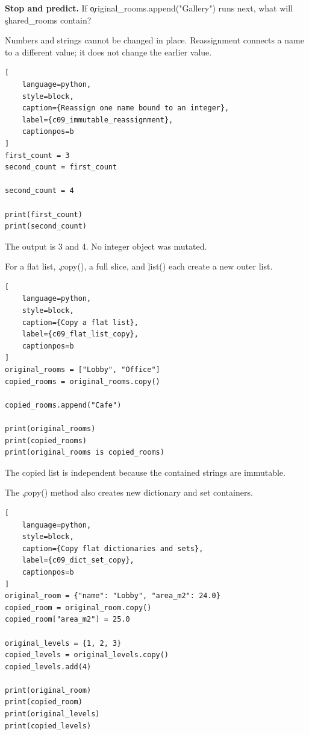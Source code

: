 \begin{NoteBox}
\textbf{Stop and predict.} If \c{original_rooms.append("Gallery")} runs next,
what will \c{shared_rooms} contain?
\end{NoteBox}


Numbers and strings cannot be changed in place. Reassignment connects a name to
a different value; it does not change the earlier value.

\begin{lstlisting}[
    language=python,
    style=block,
    caption={Reassign one name bound to an integer},
    label={c09_immutable_reassignment},
    captionpos=b
]
first_count = 3
second_count = first_count

second_count = 4

print(first_count)
print(second_count)
\end{lstlisting}

The output is 3 and 4. No integer object was mutated.


For a flat list, \c{.copy()}, a full slice, and \c{list()} each create a new
outer list.

\begin{lstlisting}[
    language=python,
    style=block,
    caption={Copy a flat list},
    label={c09_flat_list_copy},
    captionpos=b
]
original_rooms = ["Lobby", "Office"]
copied_rooms = original_rooms.copy()

copied_rooms.append("Cafe")

print(original_rooms)
print(copied_rooms)
print(original_rooms is copied_rooms)
\end{lstlisting}

The copied list is independent because the contained strings are immutable.


The \c{.copy()} method also creates new dictionary and set containers.

\begin{lstlisting}[
    language=python,
    style=block,
    caption={Copy flat dictionaries and sets},
    label={c09_dict_set_copy},
    captionpos=b
]
original_room = {"name": "Lobby", "area_m2": 24.0}
copied_room = original_room.copy()
copied_room["area_m2"] = 25.0

original_levels = {1, 2, 3}
copied_levels = original_levels.copy()
copied_levels.add(4)

print(original_room)
print(copied_room)
print(original_levels)
print(copied_levels)
\end{lstlisting}

